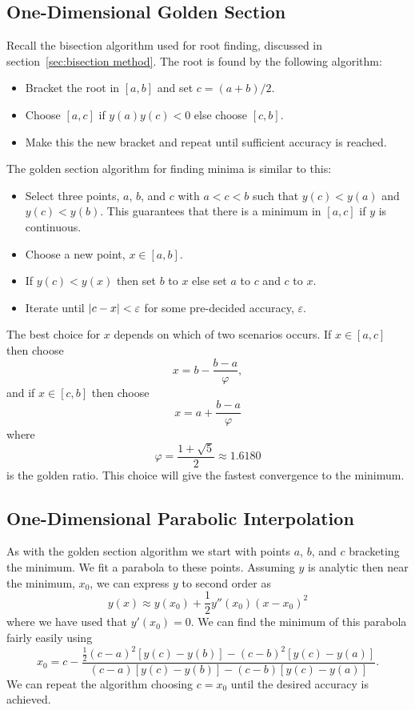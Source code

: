 \documentclass[a4paper]{article}
\begin{document}
    \subsection{One-Dimensional Golden Section}
    Recall the bisection algorithm used for root finding, discussed in section~\ref{sec:bisection method}.
    The root is found by the following algorithm:
    \begin{itemize}
        \item Bracket the root in \([a, b]\) and set \(c = (a + b)/2\).
        \item Choose \([a, c]\) if \(y(a)y(c) < 0\) else choose \([c, b]\).
        \item Make this the new bracket and repeat until sufficient accuracy is reached.
    \end{itemize}
    The golden section algorithm for finding minima is similar to this:
    \begin{itemize}
        \item Select three points, \(a\), \(b\), and \(c\) with \(a < c < b\) such that \(y(c) < y(a)\) and \(y(c) < y(b)\).
        This guarantees that there is a minimum in \([a, c]\) if \(y\) is continuous.
        \item Choose a new point, \(x\in[a, b]\).
        \item If \(y(c) < y(x)\) then set \(b\) to \(x\) else set \(a\) to \(c\) and \(c\) to \(x\).
        \item Iterate until \(\abs{c - x} < \varepsilon\) for some pre-decided accuracy, \(\varepsilon\).
    \end{itemize}
    The best choice for \(x\) depends on which of two scenarios occurs.
    If \(x \in [a, c]\) then choose
    \[x = b - \frac{b - a}{\varphi},\]
    and if \(x\in [c, b]\) then choose
    \[x = a + \frac{b - a}{\varphi}\]
    where 
    \[\varphi = \frac{1 + \sqrt{5}}{2} \approx 1.6180\]
    is the golden ratio.
    This choice will give the fastest convergence to the minimum.
    
    \subsection{One-Dimensional Parabolic Interpolation}
    As with the golden section algorithm we start with points \(a\), \(b\), and \(c\) bracketing the minimum.
    We fit a parabola to these points.
    Assuming \(y\) is analytic then near the minimum, \(x_0\), we can express \(y\) to second order as
    \[y(x) \approx y(x_0) + \frac{1}{2}y''(x_0)(x - x_0)^2\]
    where we have used that \(y'(x_0) = 0\).
    We can find the minimum of this parabola fairly easily using
    \[x_0  = c - \frac{\frac{1}{2}(c - a)^2[y(c) - y(b)] - (c - b)^2[y(c) - y(a)]}{(c - a)[y(c) - y(b)] - (c - b)[y(c) - y(a)]}.\]
    We can repeat the algorithm choosing \(c = x_0\) until the desired accuracy is achieved.
    
\end{document}
